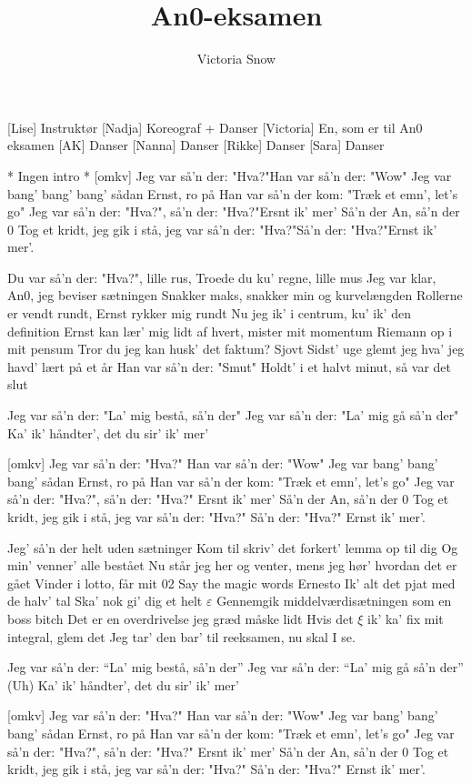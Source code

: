 \documentclass[a4paper,11pt]{article}
\title{An0-eksamen}
\author{Victoria Snow}
\begin{document}
\maketitle

\begin{roles}
[Lise] Instruktør
[Nadja] Koreograf + Danser
[Victoria] En, som er til An0 eksamen
[AK] Danser
[Nanna] Danser
[Rikke] Danser
[Sara] Danser
\end{roles}



\begin{song}
* Ingen intro *
[omkv]%
Jeg var så'n der: "Hva?"Han var så'n der: "Wow"
Jeg var bang' bang' bang' sådan Ernst, ro på
Han var så'n der kom: "Træk et emn', let's go"
Jeg var så'n der: "Hva?", så'n der: "Hva?"Ersnt ik' mer'
Så'n der An, så'n der 0
Tog et kridt, jeg gik i stå,
jeg var så'n der: "Hva?"Så'n der: "Hva?"Ernst ik' mer'.

%
Du var så'n der: "Hva?", lille rus,
Troede du ku' regne, lille mus
Jeg var klar, An0, jeg beviser sætningen
Snakker maks, snakker min og kurvelængden
Rollerne er vendt rundt, Ernst rykker mig rundt
Nu jeg ik' i centrum, ku' ik' den definition
Ernst kan lær' mig lidt af hvert, mister mit momentum
Riemann op i mit pensum
Tror du jeg kan husk' det faktum? Sjovt
Sidst' uge glemt jeg hva' jeg havd' lært på et år
Han var så'n der: "Smut"
Holdt' i et halvt minut, så var det slut

%
Jeg var så'n der: "La' mig bestå, så'n der"
Jeg var så'n der: "La' mig gå så'n der"
Ka' ik' håndter', det du sir' ik' mer'

[omkv]%
Jeg var så'n der: "Hva?" Han var så'n der: "Wow"
Jeg var bang' bang' bang' sådan Ernst, ro på
Han var så'n der kom: "Træk et emn', let's go"
Jeg var så'n der: "Hva?", så'n der: "Hva?" Ersnt ik' mer'
Så'n der An, så'n der 0
Tog et kridt, jeg gik i stå,
jeg var så'n der: "Hva?" Så'n der: "Hva?" Ernst ik' mer'.

%
Jeg' så'n der helt uden sætninger
Kom til skriv' det forkert' lemma op til dig
Og min' venner' alle bestået
Nu står jeg her og venter, mens jeg hør' hvordan det er gået
Vinder i lotto, får mit 02
Say the magic words Ernesto
Ik' alt det pjat med de halv' tal
Ska' nok gi' dig et helt $\varepsilon$
Gennemgik middelværdisætningen som en boss bitch
Det er en overdrivelse jeg græd måske lidt
Hvis det $\xi$ ik' ka' fix mit integral, glem det
Jeg tar' den bar' til reeksamen, nu skal I se.

%
Jeg var så'n der: “La' mig bestå, så'n der”
Jeg var så'n der: “La' mig gå så'n der” (Uh)
Ka' ik' håndter', det du sir' ik' mer'

[omkv]%
Jeg var så'n der: "Hva?" Han var så'n der: "Wow"
Jeg var bang' bang' bang' sådan Ernst, ro på
Han var så'n der kom: "Træk et emn', let's go"
Jeg var så'n der: "Hva?", så'n der: "Hva?" Ersnt ik' mer'
Så'n der An, så'n der 0
Tog et kridt, jeg gik i stå,
jeg var så'n der: "Hva?" Så'n der: "Hva?" Ernst ik' mer'.
\end{song}
\end{document}
